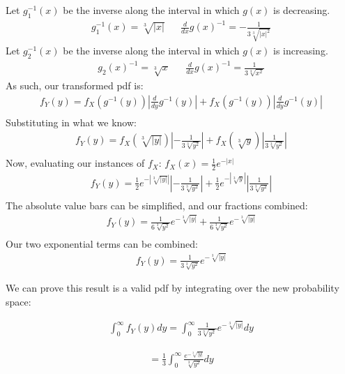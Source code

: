 \documentclass{article}
\begin{document}
Let $g_{1}^{-1}(x)$ be the inverse along the interval in which $g(x)$ is decreasing.
\begin{align*}
g_{1}^{-1}(x) =\sqrt[3]{|x|} && \frac{d}{dx} g(x)^{-1} = -\frac{1}{3\sqrt[3]{|x|^2}}
\end{align*}
Let $g_{2}^{-1}(x)$ be the inverse along the interval in which $g(x)$ is increasing.
\begin{align*}
g_{2}(x)^{-1} =  \sqrt[3]{x} && \frac{d}{dx} g(x)^{-1} = \frac{1}{3\sqrt[3]{x^2}}
\end{align*}
As such, our transformed pdf is:
\begin{align*}
f_Y(y) = f_X(g^{-1}(y))|\frac{d}{dy}g^{-1}(y)| + f_X(g^{-1}(y))|\frac{d}{dy}g^{-1}(y)| \\
\end{align*}
Substituting in what we know:
\begin{align*}
f_Y(y) = f_X(\sqrt[3]{|y|})|-\frac{1}{3\sqrt[3]{y^2}}| + f_X(\sqrt[3]{y})|\frac{1}{3\sqrt[3]{y^2}}| \\
\end{align*}
Now, evaluating our instances of $f_X$: $f_X(x)=\frac{1}{2}e^{-|x|}$
\begin{align*}
f_Y(y) = \frac{1}{2}e^{-|\sqrt[3]{|y|}|}|-\frac{1}{3\sqrt[3]{y^2}}| + \frac{1}{2}e^{-|\sqrt[3]{y}|}|\frac{1}{3\sqrt[3]{y^2}}| \\
\end{align*}
The absolute value bars can be simplified, and our fractions combined:
\begin{align*}
f_Y(y) = \frac{1}{6\sqrt[3]{y^2}}e^{-\sqrt[3]{|y|}} + \frac{1}{6\sqrt[3]{y^2}}e^{-\sqrt[3]{|y|}} \\
\end{align*}
Our two exponential terms can be combined:
\begin{align*}
\boxed{f_Y(y) = \frac{1}{3\sqrt[3]{y^2}}e^{-\sqrt[3]{|y|}}}
\end{align*}

We can prove this result is a valid pdf by integrating over the new probability space:

\begin{align*}
\int_{0}^{\infty} f_Y(y)dy = \int_{0}^{\infty} \frac{1}{3\sqrt[3]{y^2}}e^{-\sqrt[3]{|y|}} dy
\end{align*}

\begin{align*}
 = \frac{1}{3} \int_{0}^{\infty} \frac{e^{-\sqrt[3]{|y|}}}{\sqrt[3]{y^2}} dy
\end{align*}
\end{document}
